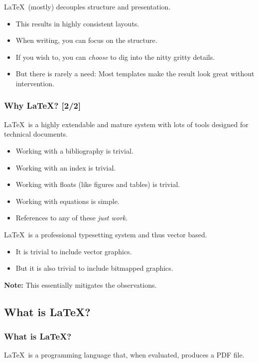 {\begin{frame}[fragile]
  \vspace{5mm}
  \LaTeX\ (mostly) decouples structure and presentation.
  \begin{itemize}
    \item This results in highly consistent layouts.
    \item When writing, you can focus on the structure.
    \item If you wish to, you can \textsl{choose} to dig into the nitty gritty details.
    \item But there is rarely a need: Most templates make the result look great without intervention.
  \end{itemize}
\end{frame}
\begin{frame}[fragile]
  \frametitle{Why \LaTeX? [2/2]}
  \vspace{2mm}
  \LaTeX\ is a highly extendable and mature system with lots of tools designed for technical documents.
  \begin{itemize}
    \item Working with a bibliography is trivial.
    \item Working with an index is trivial.
    \item Working with floats (like figures and tables) is trivial.
    \item Working with equations is simple.
    \item References to any of these \textsl{just work}.
  \end{itemize}
  
  \vspace{4mm}
  \LaTeX\ is a professional typesetting system and thus vector based.
  \begin{itemize}
    \item It is trivial to include vector graphics.
    \item But it is also trivial to include bitmapped graphics.
  \end{itemize}
  
  \vspace{4mm}
  \textbf{Note:} This essentially mitigates the observations.
\end{frame}

\subsection{What is \LaTeX?}
\begin{frame}[fragile]
  \frametitle{What is \LaTeX?}
  \vspace{3mm}
  \LaTeX\ is a programming language that, when evaluated, produces a PDF file.
  

\end{frame}}
